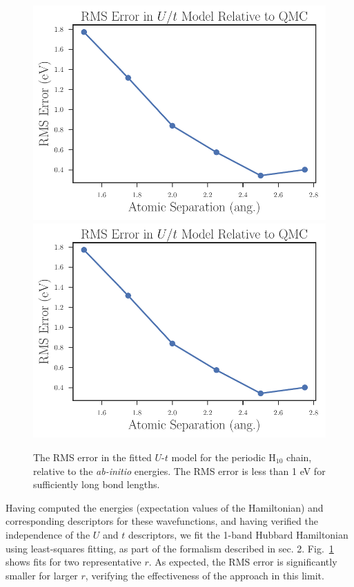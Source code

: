 \begin{figure}
\centering
\includegraphics[scale=0.5]{./Figures/rms_ut_error_vs_separation_h_chain.pdf}
\includegraphics[scale=0.5]{./Figures/rms_ut_error_vs_separation_h_chain.pdf}
\caption{The RMS error in the fitted $U$-$t$ model for the periodic H$_{10}$ chain, relative to the \textit{ab-initio} energies. The RMS error is less than 1 eV for sufficiently long bond lengths.}\label{fig:fit_quality}
\end{figure}
 

Having computed the energies (expectation values of the Hamiltonian) and corresponding 
descriptors for these wavefunctions, and having verified the independence of the $U$ and $t$ descriptors, 
we fit the 1-band Hubbard Hamiltonian using least-squares fitting, as part of the formalism described in sec. 2. 
Fig.~\ref{fig:fit_quality} shows fits for two representative $r$. As expected, the RMS error 
is significantly smaller for larger $r$, verifying the effectiveness of the approach in this limit. 

